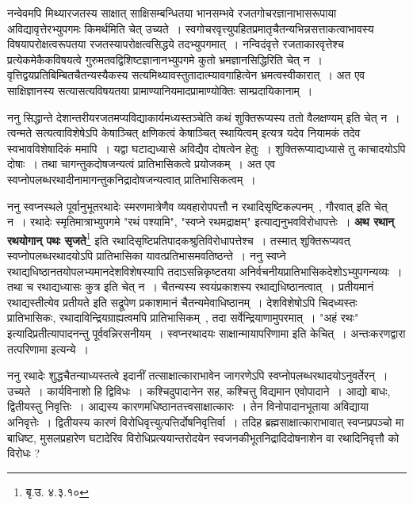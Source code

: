 	नन्वेवमपि मिथ्यारजतस्य साक्षात् साक्षिसम्बन्धितया भानसम्भवे रजतगोचरज्ञानाभासरूपाया अविद्यावृत्तेरभ्युपगमः किमर्थमिति चेत् उच्यते~। स्वगोचरवृत्त्युपहितप्रमातृचैतन्यभिन्नसत्ताकत्वाभावस्य विषयापरोक्षत्वरूपतया रजतस्यापरोक्षत्वसिद्धये तदभ्युपगमात्~। नन्विदंवृत्ते रजताकारवृत्तेश्च प्रत्येकमेकैकविषयत्वे गुरुमतवद्विशिष्टज्ञानानभ्युपगमे कुतो भ्रमज्ञानसिद्धिरिति चेत् न~। वृत्तिद्वयप्रतिबिम्बितचैतन्यस्यैकस्य सत्यमिथ्यावस्तुतादात्म्यावगाहित्वेन भ्रमत्वस्वीकारात्~। अत एव साक्षिज्ञानस्य सत्यासत्यविषयतया प्रामाण्यानियमादप्रामाण्योक्तिः साम्प्रदायिकानाम्~।\par
	ननु सिद्धान्ते देशान्तरीयरजतमप्यविद्याकार्यमध्यस्तञ्चेति कथं शुक्तिरूप्यस्य ततो वैलक्षण्यम् इति चेत् न~। त्वन्मते सत्यत्वाविशेषेऽपि केषाञ्चित् क्षणिकत्वं केषाञ्चित् स्थायित्वम् इत्यत्र यदेव नियामकं तदेव स्वभावविशेषादिकं ममापि~। यद्वा घटाद्यध्यासे अविद्यैव दोषत्वेन हेतुः~। शुक्तिरूप्याद्यध्यासे तु काचादयोऽपि दोषाः~। तथा चागन्तुकदोषजन्यत्वं प्रातिभासिकत्वे प्रयोजकम्~। अत एव स्वप्नोपलब्धरथादीनामागन्तुकनिद्रादोषजन्यत्वात् प्रातिभासिकत्वम्~।\par
	ननु स्वप्नस्थले पूर्वानुभूतरथादेः स्मरणमात्रेणैव व्यवहारोपपत्तौ न रथादिसृष्टिकल्पनम्~, गौरवात् इति चेत् न~। रथादेः स्मृतिमात्राभ्युपगमे "रथं पश्यामि", "स्वप्ने रथमद्राक्षम्" इत्याद्यनुभवविरोधापत्तेः~। {\bfseries अथ रथान् रथयोगान् पथः सृजते}\footnote{बृ.उ. ४.३.१०} इति रथादिसृष्टिप्रतिपादकश्रुतिविरोधापत्तेश्च~। तस्मात् शुक्तिरूप्यवत् स्वप्नोपलब्धरथादयोऽपि प्रातिभासिका यावत्प्रतिभासमवतिष्ठन्ते~। ननु स्वप्ने रथाद्यधिष्ठानतयोपलभ्यमानदेशविशेषस्यापि तदाऽसन्निकृष्टतया अनिर्वचनीयप्रातिभासिकदेशोऽभ्युपगन्यव्यः~। तथा च रथाद्यध्यासः कुत्र इति चेत् न~। चैतन्यस्य स्वयंप्रकाशस्य रथाद्यधिष्ठानत्वात्~। प्रतीयमानं रथाद्यस्तीत्येव प्रतीयते इति सद्रूपेण प्रकाशमानं चैतन्यमेवाधिष्ठानम्~। देशविशेषोऽपि चिदध्यस्तः प्रातिभासिकः, रथादाविन्द्रियग्राह्यत्वमपि प्रातिभासिकम्~, तदा सर्वेन्द्रियाणामुपरमात्~। "अहं रथः" इत्यादिप्रतीत्यापादनन्तु पूर्ववन्निरसनीयम्~। स्वप्नरथादयः साक्षान्मायापरिणामा इति केचित्~। अन्तःकरणद्वारा तत्परिणामा इत्यन्ये~। \par
	ननु रथादेः शुद्धचैतन्याध्यस्तत्वे इदानीं तत्साक्षात्काराभावेन जागरणेऽपि स्वप्नोपलब्धरथादयोऽनुवर्तेरन्~। उच्यते~। कार्यविनाशो हि द्विविधः~। कश्चिदुपादानेन सह, कश्चित्तु विद्यमान एवोपादाने~। आद्यो बाधः, द्वितीयस्तु निवृत्तिः~। आद्यस्य कारणमधिष्ठानतत्त्वसाक्षात्कारः~। तेन विनोपादानभूताया अविद्याया अनिवृत्तेः~। द्वितीयस्य कारणं विरोधिवृत्त्युत्पत्तिर्दोषनिवृत्तिर्वा~। तदिह ब्रह्मसाक्षात्काराभावात् स्वप्नप्रपञ्चो मा बाधिष्ट, मुसलप्रहारेण घटादेरिव विरोधिप्रत्ययान्तरोदयेन स्वजनकीभूतनिद्रादिदोषनाशेन वा रथादिनिवृत्तौ को विरोधः ?\par
